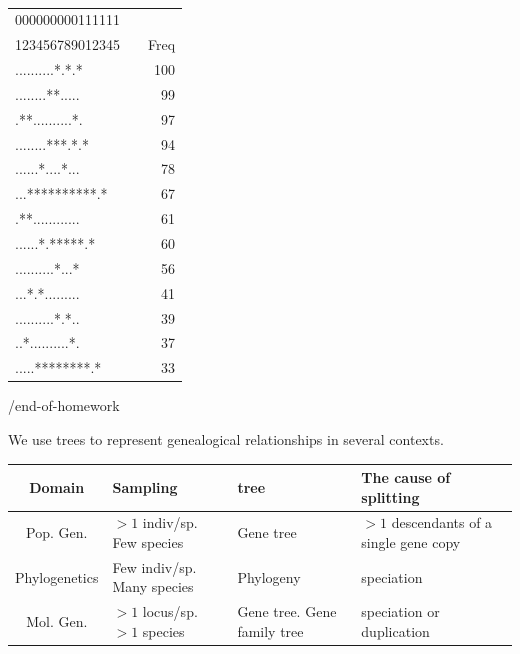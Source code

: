 \documentclass[landscape]{foils}
\begin{document}
\myNewSlide
\begin{center}
{\tt 
\begin{tabular}{|lp{0.1cm}r|}
\hline
000000000111111 & & \\
123456789012345 & & Freq \\
\hline
..........*.*.* & & 100 \\
........**..... & & 99 \\
.**..........*. & & 97 \\
........***.*.* & & 94 \\
......*....*... & & 78 \\
...**********.* & & 67 \\
.**............ & & 61 \\
......*.*****.* & & 60 \\
..........*...* & & 56 \\
...*.*......... & & 41 \\
..........*.*.. & & 39 \\
..*..........*. & & 37 \\
.....********.* & & 33 \\
\hline
\end{tabular}
}
\end{center}
/end-of-homework




\myNewSlide
We use trees to represent genealogical relationships in several contexts.
\begin{table}[htdp]
\begin{center}
\begin{tabular}{|c|p{5cm}|p{4.5cm}|p{6cm}|}
\hline
Domain & Sampling & tree & The cause of splitting \\
\hline
Pop. Gen. & $>1$ indiv/sp. Few species & Gene tree & $>1$ descendants of a single gene copy \\
\hline
Phylogenetics & Few indiv/sp. Many species & Phylogeny & speciation \\
\hline
Mol. Gen. & $>1$ locus/sp. $>1$ species & Gene tree. Gene family tree & speciation or duplication \\
\hline
\end{tabular}
\end{center}
\label{default}
\end{table}%




\myNewSlide
\end{document}

